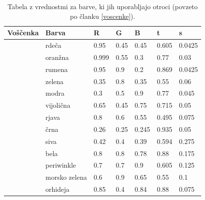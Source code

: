 \begin{table}[htb]
\begin{tabular}{ll|lll|ll}
\hline
Voščenka & Barva & R & G & B & t & s \\
\hline
& rdeča & 0.95 & 0.45 & 0.45 & 0.605 & 0.0425 \\
& oranžna & 0.999 & 0.55 & 0.3 & 0.77 & 0.03 \\
& rumena & 0.95 & 0.9 & 0.2 & 0.869 & 0.0425 \\
& zelena & 0.35 & 0.8 & 0.35 & 0.55 & 0.06 \\
& modra & 0.3 & 0.5 & 0.9 & 0.77 & 0.045 \\
& vijolična & 0.65 & 0.45 & 0.75 & 0.715 & 0.05 \\
& rjava & 0.8 & 0.6 & 0.55 & 0.495 & 0.075 \\
& črna & 0.26 & 0.25 & 0.245 & 0.935 & 0.05 \\
& siva & 0.42 & 0.4 & 0.39 & 0.594 & 0.275 \\
& bela & 0.8 & 0.8 & 0.78 & 0.88 & 0.175 \\
& periwinkle & 0.7 & 0.7 & 0.9 & 0.605 & 0.125 \\
& morsko zelena & 0.6 & 0.9 & 0.65 & 0.55 & 0.1 \\
& orhideja & 0.85 & 0.4 & 0.84 & 0.88 & 0.075 \\
\hline
\end{tabular}
\caption{Tabela z vrednostmi za barve, ki jih uporabljajo otroci (povzeto po članku \ref{voscenke}).}
\label{tbl:voscenke}
\end{table}
%